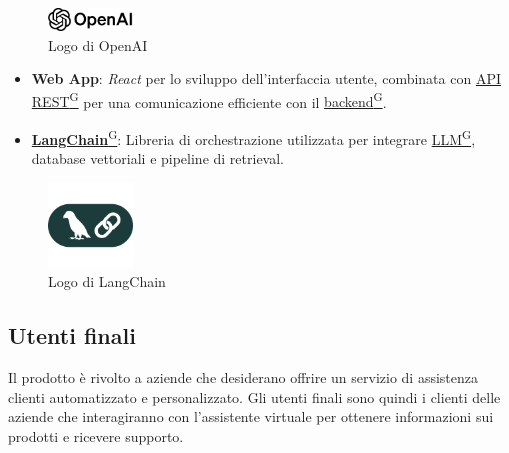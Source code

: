\begin{figure}[H]

    \centering
    \includegraphics[width=0.2\textwidth]{img/openai-lockup.png}
    \caption{Logo di OpenAI}
    \label{fig:openai_logo}

\end{figure}

\begin{itemize}
    \item \textbf{Web App}: \textit{React} per lo sviluppo dell’interfaccia utente, combinata con \href{https://code7crusaders.github.io/docs/RTB/documentazione_interna/glossario.html#api-rest-representational-state-transfer}{API REST\textsuperscript{G}} per una comunicazione efficiente con il \href{https://code7crusaders.github.io/docs/RTB/documentazione_interna/glossario.html#backend}{backend\textsuperscript{G}}.
    \item \href{https://code7crusaders.github.io/docs/RTB/documentazione_interna/glossario.html#langchain}{\textbf{LangChain}\textsuperscript{G}}: Libreria di orchestrazione utilizzata per integrare \href{https://code7crusaders.github.io/docs/RTB/documentazione_interna/glossario.html#llm-large-language-model}{LLM\textsuperscript{G}}, database vettoriali e pipeline di retrieval.
\end{itemize}

\begin{figure}[H]
    \centering
    \includegraphics[width=0.2\textwidth]{img/lang-chain.png}
    \caption{Logo di LangChain}
    \label{fig:langchain_logo}
\end{figure}


\subsection{Utenti finali}
Il prodotto è rivolto a aziende che desiderano offrire un servizio di assistenza 
clienti automatizzato e personalizzato. Gli utenti finali sono quindi i clienti 
delle aziende che interagiranno con l’assistente virtuale per ottenere 
informazioni sui prodotti e ricevere supporto.